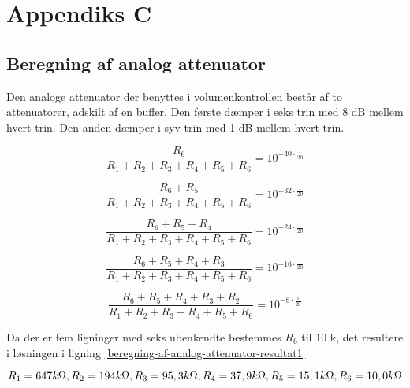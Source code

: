 \chapter{Appendiks C}
\label{beregning-af-analog-attenuator}
\section*{Beregning af analog attenuator}

Den analoge attenuator der benyttes i volumenkontrollen består af to attenuatorer, adskilt af en buffer. Den første dæmper i seks trin med 8 dB mellem hvert trin. Den anden dæmper i syv trin med 1 dB mellem hvert trin.

\begin{equation}
\frac{R_6}{R_1 + R_2 + R_3 + R_4 + R_5 + R_6} = 10^{-40 \cdot \frac{1}{20}}
\end{equation}

\begin{equation}
\frac{R_6 + R_5}{R_1 + R_2 + R_3 + R_4 + R_5 + R_6} = 10^{-32 \cdot \frac{1}{20}}
\end{equation}

\begin{equation}
\frac{R_6 + R_5 + R_4}{R_1 + R_2 + R_3 + R_4 + R_5 + R_6} = 10^{-24 \cdot \frac{1}{20}}
\end{equation}

\begin{equation}
\frac{R_6 + R_5 + R_4 + R_3}{R_1 + R_2 + R_3 + R_4 + R_5 + R_6} = 10^{-16 \cdot \frac{1}{20}}
\end{equation}

\begin{equation}
\frac{R_6 + R_5 + R_4 + R_3 + R_2}{R_1 + R_2 + R_3 + R_4 + R_5 + R_6} = 10^{-8 \cdot \frac{1}{20}}
\end{equation}

Da der er fem ligninger med seks ubenkendte bestemmes $R_6$ til 10 k\ohm, det resultere i løsningen i ligning \ref{beregning-af-analog-attenuator-resultat1}

\begin{equation}
\label{beregning-af-analog-attenuator-resultat1}
R_1 = 647 k\ohm, R_2 = 194 k\ohm, R_3 = 95,3 k\ohm, R_4 = 37,9 k\ohm, R_5 = 15,1  k\ohm, R_6 = 10,0 k\ohm
\end{equation}